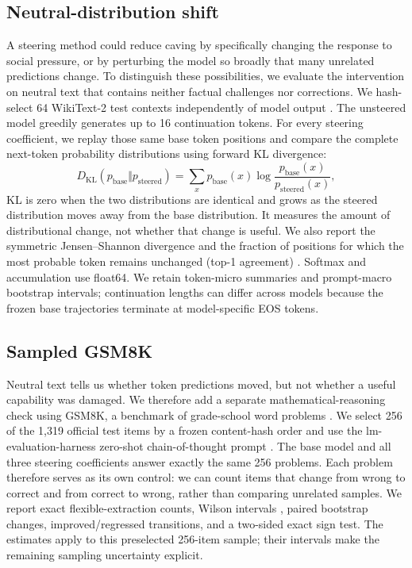 \documentclass[11pt]{article}
\begin{document}
\subsection{Neutral-distribution shift}

A steering method could reduce caving by specifically changing the response to
social pressure, or by perturbing the model so broadly that many unrelated
predictions change. To distinguish these possibilities, we evaluate the
intervention on neutral text that contains neither factual challenges nor
corrections. We hash-select 64 WikiText-2 test contexts independently of model
output \citep{merity2017wikitext}. The unsteered model greedily generates up to
16 continuation tokens. For every steering coefficient, we replay those same
base token positions and compare the complete next-token probability
distributions using forward KL divergence:
\begin{equation}
  D_{\mathrm{KL}}(p_{\mathrm{base}}\Vert p_{\mathrm{steered}})
  = \sum_x p_{\mathrm{base}}(x)
  \log\frac{p_{\mathrm{base}}(x)}{p_{\mathrm{steered}}(x)},
  \label{eq:kl}
\end{equation}
KL is zero when the two distributions are identical and grows as the steered
distribution moves away from the base distribution. It measures the amount of
distributional change, not whether that change is useful. We also report the
symmetric Jensen--Shannon divergence and the fraction of positions for which
the most probable token remains unchanged (top-1 agreement)
\citep{kullback1951information,lin1991divergence}. Softmax and accumulation use
float64. We retain token-micro summaries and prompt-macro bootstrap intervals;
continuation lengths can differ across models because the frozen base
trajectories terminate at model-specific EOS tokens.

\subsection{Sampled GSM8K}

Neutral text tells us whether token predictions moved, but not whether a useful
capability was damaged. We therefore add a separate mathematical-reasoning
check using GSM8K, a benchmark of grade-school word problems
\citep{cobbe2021gsm8k}. We select 256 of the 1,319 official test items by a
frozen content-hash order and use the lm-evaluation-harness zero-shot
chain-of-thought prompt
\citep{biderman2024reproducible,kojima2022zeroshot}. The base model and all
three steering coefficients answer exactly the same 256 problems. Each problem
therefore serves as its own control: we can count items that change from wrong
to correct and from correct to wrong, rather than comparing unrelated samples.
We report exact
flexible-extraction counts, Wilson intervals
\citep{wilson1927interval}, paired bootstrap changes, improved/regressed
transitions, and a two-sided exact sign test. The estimates apply to this
preselected 256-item sample; their intervals make the remaining sampling
uncertainty explicit.
\end{document}
